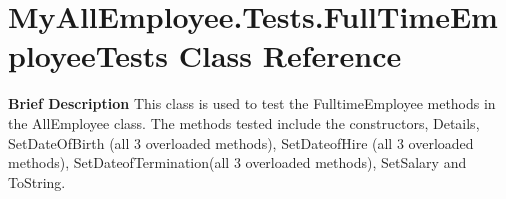 \hypertarget{class_my_all_employee_1_1_tests_1_1_full_time_employee_tests}{}\section{My\+All\+Employee.\+Tests.\+Full\+Time\+Employee\+Tests Class Reference}
\label{class_my_all_employee_1_1_tests_1_1_full_time_employee_tests}


{\bfseries  Brief Description} This class is used to test the Fulltime\+Employee methods in the All\+Employee class. The methods tested include the constructors, Details, Set\+Date\+Of\+Birth (all 3 overloaded methods), Set\+Dateof\+Hire (all 3 overloaded methods), Set\+Dateof\+Termination(all 3 overloaded methods), Set\+Salary and To\+String.  


